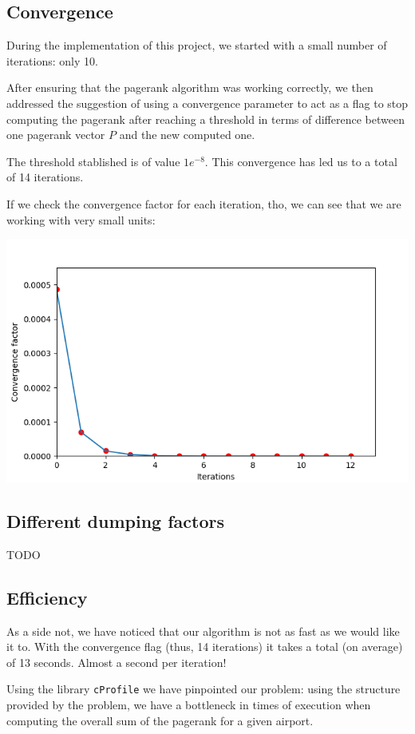 \documentclass[10pt, a4paper]{article}
\begin{document}
\subsection{Convergence}
During the implementation of this project, we started with a small number of iterations: only 10.

After ensuring that the pagerank algorithm was working correctly, we then addressed the suggestion of using a convergence parameter to act as a flag to stop computing the pagerank after reaching a threshold in terms of difference between one pagerank vector $P$ and the new computed one.

The threshold stablished is of value  $1e^{-8}$.  This convergence has led us to a total of 14 iterations.

If we check the convergence factor for each iteration, tho, we can see that we are working with very small units:

\begin{center}
        \includegraphics[width=0.75\linewidth]{plot_conv.png}
\end{center}


\subsection{Different dumping factors}

TODO

\subsection{Efficiency}
As a side not, we have noticed that our algorithm is not as fast as we would like it to. With the convergence flag (thus, 14 iterations) it takes a total (on average) of 13 seconds. Almost a second per iteration!

Using the library \texttt{cProfile} we have pinpointed our problem: using the structure provided by the problem, 
we have a bottleneck in times of execution when computing the overall sum of the pagerank for a given airport. 
\end{document}
